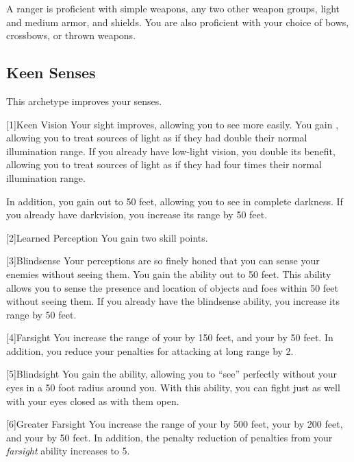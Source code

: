         A ranger is proficient with simple weapons, any two other weapon groups, light and medium armor, and shields.
        You are also proficient with your choice of bows, crossbows, or thrown weapons.

    \subsection{Keen Senses}
        This archetype improves your senses.

        [1]{Keen Vision}
        Your sight improves, allowing you to see more easily.
        You gain , allowing you to treat sources of light as if they had double their normal illumination range.
        If you already have low-light vision, you double its benefit, allowing you to treat sources of light as if they had four times their normal illumination range.

        In addition, you gain  out to 50 feet, allowing you to see in complete darkness.
        If you already have darkvision, you increase its range by 50 feet.

        [2]{Learned Perception} You gain two skill points.

        [3]{Blindsense}
        Your perceptions are so finely honed that you can sense your enemies without seeing them.
        You gain the  ability out to 50 feet.
        This ability allows you to sense the presence and location of objects and foes within 50 feet without seeing them.
        If you already have the blindsense ability, you increase its range by 50 feet.

        [4]{Farsight}
        You increase the range of your  by 150 feet, and your  by 50 feet.
        In addition, you reduce your  penalties for attacking at long range by 2.

        [5]{Blindsight}
        You gain the  ability, allowing you to ``see'' perfectly without your eyes in a 50 foot radius around you.
        With this ability, you can fight just as well with your eyes closed as with them open.

        [6]{Greater Farsight}
        You increase the range of your  by 500 feet, your  by 200 feet, and your  by 50 feet.
        In addition, the penalty reduction of  penalties from your \textit{farsight} ability increases to 5.


